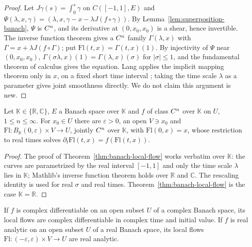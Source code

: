 \begin{proof}
  \leanok
  Let $J\gamma(s) = \int_0^s \gamma$ on $C([-1, 1], E)$ and
  $\Psi(\lambda, x, \gamma) = (\lambda, x, \gamma - x - \lambda J(f \circ \gamma))$. By
  Lemma~\ref{lem:superposition-banach}, $\Psi$ is $C^{n}$, and its derivative at
  $(0, x_0, x_0)$ is a shear, hence invertible. The inverse function theorem gives a $C^{n}$
  family $\Gamma(\lambda, x)$ with $\Gamma = x + \lambda J(f \circ \Gamma)$; put
  $\mathrm{Fl}(t, x) = \Gamma(t, x)(1)$. By injectivity of $\Psi$ near $(0, x_0, x_0)$,
  $\Gamma(\sigma\lambda, x)(1) = \Gamma(\lambda, x)(\sigma)$ for $|\sigma| \le 1$, and the
  fundamental theorem of calculus gives the equation. Lang applies the implicit mapping theorem
  only in $x$, on a fixed short time interval \cite[Theorem~IV.1.14]{Lan99}; taking the time
  scale $\lambda$ as a parameter gives joint smoothness directly. We do not claim this argument is
  new.
\end{proof}

\begin{theorem}
  \label{thm:banach-local-flow-rclike}
  \leanok
  Let $\mathbb{K} \in \{\mathbb{R}, \mathbb{C}\}$, $E$ a Banach space over $\mathbb{K}$ and $f$
  of class $C^{n}$ over $\mathbb{K}$ on $U$, $1 \le n \le \infty$. For $x_0 \in U$ there are
  $\varepsilon > 0$, an open $V \ni x_0$ and $\mathrm{Fl} \colon B_{\mathbb{K}}(0, \varepsilon)
  \times V \to U$, jointly $C^{n}$ over $\mathbb{K}$, with $\mathrm{Fl}(0, x) = x$, whose
  restriction to real times solves $\partial_t \mathrm{Fl}(t, x) = f(\mathrm{Fl}(t, x))$.
\end{theorem}

\begin{proof}
  \leanok
  The proof of Theorem~\ref{thm:banach-local-flow} works verbatim over $\mathbb{K}$: the curves
  are parametrized by the real interval $[-1, 1]$ and only the time scale $\lambda$ lies in
  $\mathbb{K}$; Mathlib's inverse function theorem holds over $\mathbb{R}$ and $\mathbb{C}$. The
  rescaling identity is used for real $\sigma$ and real times. Theorem~\ref{thm:banach-local-flow}
  is the case $\mathbb{K} = \mathbb{R}$.
\end{proof}

\begin{theorem}
  \label{thm:banach-local-flow-analytic}
  \leanok
  If $f$ is complex differentiable on an open subset $U$ of a complex Banach space, its local
  flows are complex differentiable in complex time and initial value. If $f$ is real analytic on
  an open subset $U$ of a real Banach space, its local flows
  $\mathrm{Fl} \colon (-\varepsilon, \varepsilon) \times V \to U$ are real analytic.
\end{theorem}

